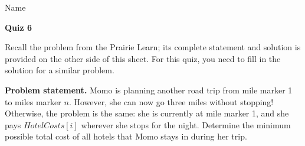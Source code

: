 \documentclass[11pt]{article}
\begin{document}
\noindent Name \underline{\hspace{12cm}}\\


\begin{center}
\LARGE\textbf{Quiz 6}%
\end{center}



Recall the problem from the Prairie Learn; its complete statement and solution
is provided on the other side of this sheet. For this quiz, you need to fill in
the solution for a similar problem.

\textbf{Problem statement.}
Momo is planning another road trip from mile marker 1 to miles marker $n$.
However, she can now go three miles without stopping! Otherwise, the problem
is the same: she is currently at mile marker 1, and she pays $HotelCosts[i]$
wherever she stops for the night.
Determine the minimum possible total cost of all hotels that Momo
stays in during her trip.
\end{document}
